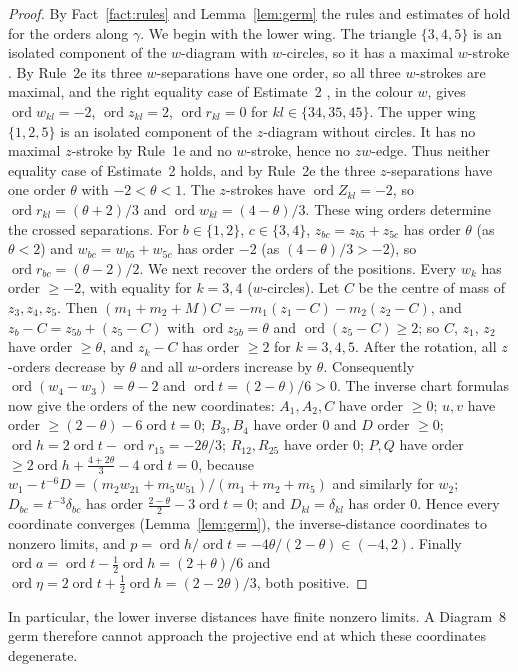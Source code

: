 \documentclass[11pt]{amsart}
\theoremstyle{definition}
\theoremstyle{remark}
\newcommand{\ord}{\operatorname{ord}}
\begin{document}
\begin{proof}
By Fact~\ref{fact:rules} and Lemma~\ref{lem:germ} the rules and estimates of \cite[\S3]{AK}
hold for the orders along $\gamma$.
We begin with the lower wing.  The triangle $\{3,4,5\}$ is an isolated component of
the $w$-diagram with $w$-circles, so it has a maximal $w$-stroke
\cite[Rule~1e, p.~546]{AK}.  By Rule~2e its three
$w$-separations have one order, so all three $w$-strokes are maximal, and the right equality
case of Estimate~2 \cite[p.~548]{AK}, in the colour $w$, gives $\ord w_{kl}=-2$,
$\ord z_{kl}=2$, $\ord r_{kl}=0$ for $kl\in\{34,35,45\}$.
The upper wing $\{1,2,5\}$ is an isolated component of the $z$-diagram without
circles.  It has no maximal $z$-stroke by Rule~1e and no $w$-stroke, hence no $zw$-edge.
Thus
neither equality case of Estimate~2 holds, and by Rule~2e the three $z$-separations have one
order $\theta$ with $-2<\theta<1$.  The $z$-strokes have $\ord Z_{kl}=-2$, so
$\ord r_{kl}=(\theta+2)/3$ and $\ord w_{kl}=(4-\theta)/3$.
These wing orders determine the crossed separations.  For $b\in\{1,2\}$, $c\in\{3,4\}$, $z_{bc}=z_{b5}+z_{5c}$ has order
$\theta$ (as $\theta<2$) and $w_{bc}=w_{b5}+w_{5c}$ has order $-2$ (as $(4-\theta)/3>-2$), so
$\ord r_{bc}=(\theta-2)/2$.
We next recover the orders of the positions.  Every $w_k$ has order $\ge-2$, with equality for $k=3,4$ ($w$-circles).  Let
$C$ be the centre of mass of $z_3,z_4,z_5$.  Then $(m_1+m_2+M)C=-m_1(z_1-C)-m_2(z_2-C)$, and
$z_b-C=z_{5b}+(z_5-C)$ with $\ord z_{5b}=\theta$ and $\ord(z_5-C)\ge2$; so $C$, $z_1$, $z_2$
have order $\ge\theta$, and $z_k-C$ has order $\ge2$ for $k=3,4,5$.
After the rotation, all $z$-orders decrease by $\theta$ and all $w$-orders increase
by $\theta$.  Consequently $\ord(w_4-w_3)=\theta-2$ and
$\ord t=(2-\theta)/6>0$.  The inverse chart formulas now give the orders of the new
coordinates: $A_1,A_2,C$ have order $\ge0$; $u,v$ have order $\ge(2-\theta)-6\ord t=0$; $B_3,B_4$
have order $0$ and $D$ order $\ge0$; $\ord h=2\ord t-\ord r_{15}=-2\theta/3$; $R_{12},R_{25}$
have order $0$; $P,Q$ have order $\ge2\ord h+\frac{4+2\theta}3-4\ord t=0$, because
$w_1-t^{-6}D=(m_2w_{21}+m_5w_{51})/(m_1+m_2+m_5)$ and similarly for $w_2$; $D_{bc}=t^{-3}\delta_{bc}$
has order $\frac{2-\theta}2-3\ord t=0$; and $D_{kl}=\delta_{kl}$ has order $0$.  Hence every
coordinate converges (Lemma~\ref{lem:germ}), the inverse-distance coordinates to nonzero limits,
and $p=\ord h/\ord t=-4\theta/(2-\theta)\in(-4,2)$.  Finally
$\ord a=\ord t-\frac12\ord h=(2+\theta)/6$ and $\ord\eta=2\ord t+\frac12\ord h=(2-2\theta)/3$,
both positive.
\end{proof}
In particular, the lower inverse distances have finite nonzero limits.
A Diagram~8 germ therefore cannot approach the projective end at which these
coordinates degenerate.
\end{document}
